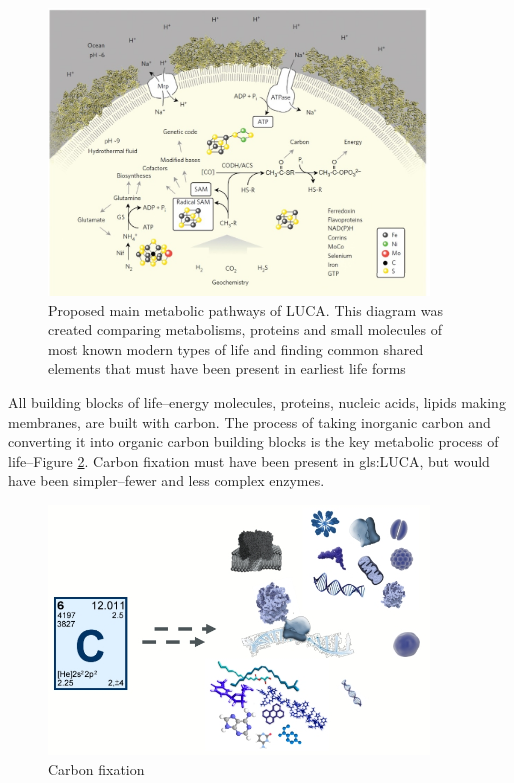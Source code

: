 \documentclass[]{article}
\begin{document}
\begin{figure}[H]
	\caption[Proposed main metabolic pathways of LUCA.]{Proposed main metabolic pathways of LUCA. This diagram was created comparing metabolisms, proteins and small molecules of most known modern types of life and finding common shared elements that must have been present in earliest life forms\cite{weiss2016physiology}} \label{fig:LUCA_Environment} 
	\includegraphics[width=0.9\textwidth]{LUCA_Environment}
\end{figure}

All building blocks of life--energy molecules, proteins, nucleic acids, lipids making membranes, are built with carbon.
The process of taking inorganic carbon and converting it into organic carbon building blocks is the key metabolic process of life--Figure \ref{fig:CarbonRules}. Carbon fixation must have been present in \gls{gls:LUCA}, but would have been simpler--fewer and less complex enzymes.
\begin{figure}[H]
	\caption{Carbon fixation} \label{fig:CarbonRules} 
	\includegraphics[width=0.9\textwidth]{CarbonRules}
\end{figure}
\end{document}
